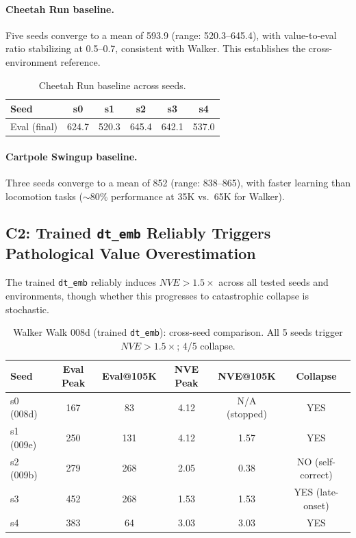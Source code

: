 \documentclass[letterpaper]{article}
\newcommand{\nve}{NVE\xspace}
\newcommand{\dtemb}{\texttt{dt\_emb}\xspace}
\begin{document}
\paragraph{Cheetah Run baseline.} Five seeds converge to a mean of 593.9 (range: 520.3--645.4), with value-to-eval ratio stabilizing at 0.5--0.7, consistent with Walker. This establishes the cross-environment reference.

\begin{table}[h]
\centering
\caption{Cheetah Run baseline across seeds.}
\label{tab:cheetah_baseline}
\begin{tabular}{lccccc}
\toprule
Seed & s0 & s1 & s2 & s3 & s4 \\
\midrule
Eval (final) & 624.7 & 520.3 & 645.4 & 642.1 & 537.0 \\
\bottomrule
\end{tabular}
\end{table}

\paragraph{Cartpole Swingup baseline.} Three seeds converge to a mean of 852 (range: 838--865), with faster learning than locomotion tasks ($\sim$80\% performance at 35K vs.\ 65K for Walker).

\subsection{C2: Trained \dtemb Reliably Triggers Pathological Value Overestimation}
\label{sec:c2}

The trained \dtemb reliably induces $\nve > 1.5\times$ across all tested seeds and environments, though whether this progresses to catastrophic collapse is stochastic.

\begin{table}[h]
\centering
\caption{Walker Walk 008d (trained \dtemb): cross-seed comparison. All 5 seeds trigger $\nve > 1.5\times$; 4/5 collapse.}
\label{tab:008d_seeds}
\begin{tabular}{lccccc}
\toprule
Seed & Eval Peak & Eval@105K & NVE Peak & NVE@105K & Collapse \\
\midrule
s0 (008d) & 167 & 83 & 4.12 & N/A (stopped) & YES \\
s1 (009e) & 250 & 131 & 4.12 & 1.57 & YES \\
s2 (009b) & 279 & 268 & 2.05 & 0.38 & NO (self-correct) \\
s3 & 452 & 268 & 1.53 & 1.53 & YES (late-onset) \\
s4 & 383 & 64 & 3.03 & 3.03 & YES \\
\bottomrule
\end{tabular}
\end{table}
\end{document}
